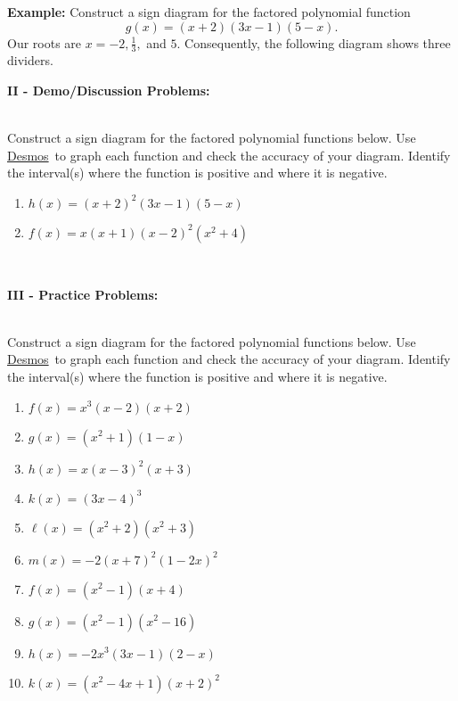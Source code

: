 \documentclass[12pt]{article}
\theoremstyle{definition}
\newcommand{\Desmos}{\href{https://www.desmos.com/}{Desmos}}
\begin{document}
{\bf Example:} Construct a sign diagram for the factored polynomial function $$g(x)=(x+2)(3x-1)(5-x).$$
Our roots are $x=-2,\frac{1}{3},$ and $5$.  Consequently, the following diagram shows three dividers.

\begin{center}
\end{center}
{\bf II - Demo/Discussion Problems:}\\
\ \par
Construct a sign diagram for the factored polynomial functions below. Use \Desmos \ to graph each function and check the accuracy of your diagram.  Identify the interval(s) where the function is positive and where it is negative.
\begin{enumerate}
	\item $h(x)=(x+2)^2(3x-1)(5-x)$
	\item $f(x)=x(x+1)(x-2)^2(x^2+4)$
\end{enumerate}	
\ \par
{\bf III - Practice Problems:}\\
\ \par
Construct a sign diagram for the factored polynomial functions below. Use \Desmos \ to graph each function and check the accuracy of your diagram.  Identify the interval(s) where the function is positive and where it is negative.
\begin{multicols}{2}
\begin{enumerate}
  \item $f(x)=x^3(x-2)(x+2)$
	\item $g(x)=(x^2+1)(1-x)$
	\item $h(x)=x(x-3)^2(x+3)$
	\item $k(x)=(3x-4)^3$
  \item $\ell(x)=(x^2+2)(x^2+3)$
  \item $m(x)=-2(x+7)^2(1-2x)^2$
  \item $f(x)=(x^2-1)(x+4)$
	\item $g(x)=(x^2-1)(x^2-16)$
	\item $h(x)=-2x^3(3x-1)(2-x)$
	\item $k(x)=(x^2-4x+1)(x+2)^2$
\end{enumerate}
\end{multicols}
\newpage
\end{document}
